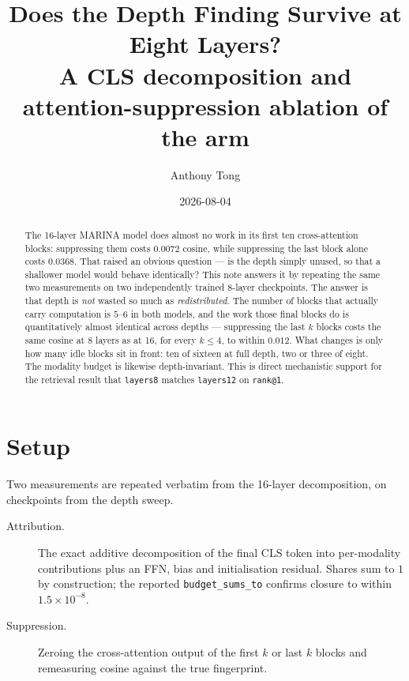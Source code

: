 \documentclass[11pt]{article}
\title{Does the Depth Finding Survive at Eight Layers?\\
\large A CLS decomposition and attention-suppression ablation of the
\code{layers8} arm}
\author{Anthony Tong}
\date{2026-08-04}
\newcommand{\code}[1]{\texttt{\small #1}}
\begin{document}
\maketitle

\begin{abstract}
The 16-layer MARINA model does almost no work in its first ten cross-attention
blocks: suppressing them costs $0.0072$ cosine, while suppressing the last block
alone costs $0.0368$. That raised an obvious question --- is the depth simply
unused, so that a shallower model would behave identically? This note answers it
by repeating the same two measurements on two independently trained 8-layer
checkpoints. The answer is that depth is \emph{not} wasted so much as
\emph{redistributed}. The number of blocks that actually carry computation is
$5$--$6$ in both models, and the work those final blocks do is quantitatively
almost identical across depths --- suppressing the last $k$ blocks costs the same
cosine at 8 layers as at 16, for every $k \le 4$, to within $0.012$. What changes
is only how many idle blocks sit in front: ten of sixteen at full depth, two or
three of eight. The modality budget is likewise depth-invariant. This is direct
mechanistic support for the retrieval result that \code{layers8} matches
\code{layers12} on \code{rank@1}.
\end{abstract}

\section{Setup}

Two measurements are repeated verbatim from the 16-layer decomposition, on
checkpoints from the depth sweep.

\begin{description}
  \item[Attribution.] The exact additive decomposition of the final CLS token
    into per-modality contributions plus an FFN, bias and initialisation
    residual. Shares sum to $1$ by construction; the reported
    \code{budget\_sums\_to} confirms closure to within $1.5\times 10^{-8}$.
  \item[Suppression.] Zeroing the cross-attention output of the first $k$ or
    last $k$ blocks and remeasuring cosine against the true fingerprint.
\end{description}
\end{document}
